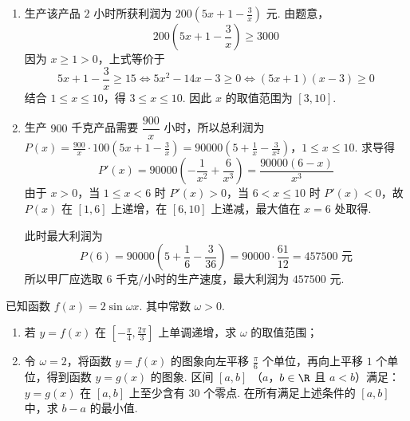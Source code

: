 \begin{solution}
\begin{enumerate}
\item 生产该产品 \(2\) 小时所获利润为 \(200\left(5x+1-\frac{3}{x}\right)\) 元. 由题意，
\[
200\left(5x+1-\frac{3}{x}\right)\geqslant3000
\]
因为 \(x\geqslant1>0\)，上式等价于
\[
5x+1-\frac{3}{x}\geqslant15
\Longleftrightarrow 5x^2-14x-3\geqslant0
\Longleftrightarrow (5x+1)(x-3)\geqslant0
\]
结合 \(1\leqslant x\leqslant10\)，得 \(3\leqslant x\leqslant10\). 因此 \(x\) 的取值范围为 \([3,10]\).

\item 生产 \(900\) 千克产品需要 \(\dfrac{900}{x}\) 小时，所以总利润为
\(P(x)=\frac{900}{x}\cdot100\left(5x+1-\frac{3}{x}\right)=90000\left(5+\frac{1}{x}-\frac{3}{x^2}\right)\)，\(1\leqslant x\leqslant10\).
求导得
\[
P'(x)=90000\left(-\frac{1}{x^2}+\frac{6}{x^3}\right)=\frac{90000(6-x)}{x^3}
\]
由于 \(x>0\)，当 \(1\leqslant x<6\) 时 \(P'(x)>0\)，当 \(6<x\leqslant10\) 时 \(P'(x)<0\)，故 \(P(x)\) 在 \([1,6]\) 上递增，在 \([6,10]\) 上递减，最大值在 \(x=6\) 处取得.

此时最大利润为
\[
P(6)=90000\left(5+\frac{1}{6}-\frac{3}{36}\right)=90000\cdot\frac{61}{12}=457500\text{ 元}
\]
所以甲厂应选取 \(6\) 千克/小时的生产速度，最大利润为 \(457500\) 元.
\end{enumerate}
\end{solution}

\begin{problem}
已知函数 \(f(x)=2\sin\omega x\). 其中常数 \(\omega>0\).
\begin{enumerate}
\item 若 \(y=f(x)\) 在 \(\left[-\frac{\pi}{4},\frac{2\pi}{3}\right]\) 上单调递增，求 \(\omega\) 的取值范围；
\item 令 \(\omega=2\)，将函数 \(y=f(x)\) 的图象向左平移 \(\frac{\pi}{6}\) 个单位，再向上平移 \(1\) 个单位，得到函数 \(y=g(x)\) 的图象. 区间 \([a,b]\) （\(a\)，\(b\in\R\) 且 \(a<b\)）满足：\(y=g(x)\) 在 \([a,b]\) 上至少含有 \(30\) 个零点. 在所有满足上述条件的 \([a,b]\) 中，求 \(b-a\) 的最小值.
\end{enumerate}
\end{problem}

